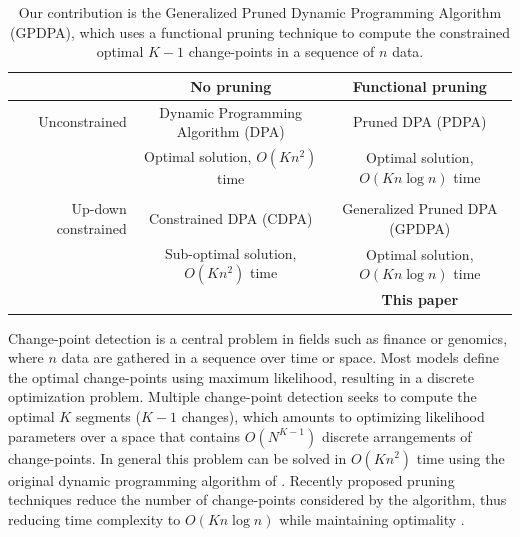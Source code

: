 \documentclass{article}
\begin{document}
\begin{table}
  \centering
  \begin{tabular}{r|c|c}
    & No pruning & Functional pruning \\
    \hline
    Unconstrained & Dynamic Programming Algorithm (DPA) & Pruned DPA (PDPA) \\
    & Optimal solution, $O(Kn^2)$ time & Optimal solution, $O(Kn\log n)$ time\\
    & \citet{segment-neighborhood, optimal-partitioning}     & \citet{pruned-dp, johnson} \\
    \hline
    Up-down constrained & Constrained DPA (CDPA) & Generalized Pruned DPA (GPDPA) \\
    & Sub-optimal solution, $O(Kn^2)$ time & Optimal solution, $O(Kn\log n)$ time\\
    & \citet{HOCKING-PeakSeg} & \textbf{This paper} \\
    \hline
  \end{tabular}
  \caption{Our contribution is 
the Generalized Pruned Dynamic Programming Algorithm (GPDPA), 
 which uses a functional pruning technique 
    to compute the constrained optimal $K-1$ change-points 
in a sequence of $n$ data.}
\label{tab:contribution}
\end{table}

Change-point detection is a central problem in fields such as finance
or genomics, where $n$ data are gathered in a sequence over time or
space. Most models define the optimal change-points using maximum
likelihood, resulting in a discrete optimization problem. Multiple
change-point detection seeks to compute the optimal $K$ segments
($K-1$ changes), which amounts to optimizing likelihood
parameters over a space that contains $O(N^{K-1})$ discrete
arrangements of change-points. In general this problem can be solved
in $O(Kn^2)$ time using the original dynamic programming algorithm of
\citet{segment-neighborhood}. Recently proposed pruning techniques
reduce the number of change-points considered by the algorithm, thus
reducing time complexity to $O(K n\log n)$ while maintaining
optimality \citep{pruned-dp, pelt, johnson, fpop}.
\end{document}
